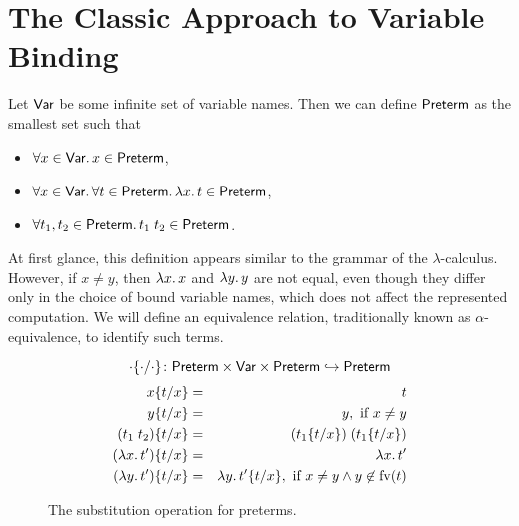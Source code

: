 \section{The Classic Approach to Variable Binding}
\label{sec:syntax_classic}

\newcommand\Preterm{\syncatset{Preterm}}
\newcommand\Term{\syncatset{Term}}
\newcommand\Var{\syncatset{Var}}
\newcommand\FVars[1]{\mathrm{fv}(#1)}
\newcommand\Subst[3]{#1\{#2/#3\}}
\newcommand\Aeq{\equiv_\alpha}

Let $\Var$ be some infinite set of variable names.
Then we can define $\Preterm$ as the smallest set such that
\begin{itemize}
\item $\forall x \in \Var\ldotp x \in \Preterm$,
\item $\forall x \in \Var\ldotp\forall t \in \Preterm\ldotp \lambda x\ldotp t \in \Preterm$,
\item $\forall t_1, t_2 \in \Preterm\ldotp t_1\;t_2 \in \Preterm$.
\end{itemize}
At first glance, this definition appears similar to the grammar of the
$\lambda$-calculus.
However, if $x \neq y$, then $\lambda x\ldotp x$ and $\lambda y\ldotp y$ are
not equal, even though they differ only in the choice of bound variable names,
which does not affect the represented computation. We will define an
equivalence relation, traditionally known as $\alpha$-equivalence, to identify
such terms.

\begin{figure}[t!!]
\[
  \Subst{\cdot}{\cdot}{\cdot} \colon
  \Preterm \times \Var \times \Preterm \partialmap \Preterm
\]
\begin{eqnarray*}
  \Subst{x}{t}{x}          & = & t \\
  \Subst{y}{t}{x}          & = & y, \text{ if } x \ne y \\
  \Subst{(t_1\;t_2)}{t}{x} & = & (\Subst{t_1}{t}{x})\;(\Subst{t_1}{t}{x}) \\
  \Subst{(\lambda x\ldotp t')}{t}{x} & = & \lambda x\ldotp t' \\
  \Subst{(\lambda y\ldotp t')}{t}{x} & = & \lambda y\ldotp \Subst{t'}{t}{x}, \text{ if } x \ne y \land y \not\in \FVars{t}
\end{eqnarray*}
\caption{The substitution operation for preterms.}
\label{fig:syntax_preterm_subst}
\end{figure}

